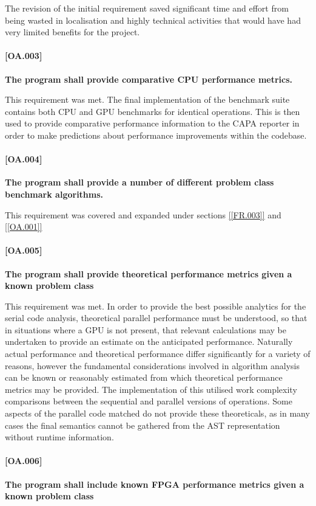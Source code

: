 The revision of the initial requirement saved significant time and effort from being wasted in
localisation and highly technical activities that would have had very limited benefits for the
project.

\paragraph{[OA.003]}
\textbf{The program shall provide comparative CPU performance metrics.}

This requirement was met. The final implementation of the benchmark suite contains both CPU and GPU
benchmarks for identical operations. This is then used to provide comparative performance
information to the CAPA reporter in order to make predictions about performance improvements within
the codebase.

\paragraph{[OA.004]}
\textbf{The program shall provide a number of different problem class benchmark algorithms.}

This requirement was covered and expanded under sections \ref{[FR.003]} and \ref{[OA.001]}

\paragraph{[OA.005]} \label{[OA.005]}
\textbf{The program shall provide theoretical performance metrics given a known problem class}

This requirement was met. In order to provide the best possible analytics for the serial code
analysis, theoretical parallel performance must be understood, so that in situations where a GPU is
not present, that relevant calculations may be undertaken to provide an estimate on the anticipated
performance. Naturally actual performance and theoretical performance differ significantly for a
variety of reasons, however the fundamental considerations involved in algorithm analysis can be
known or reasonably estimated from which theoretical performance metrics may be provided. The
implementation of this utilised work complexity comparisons between the sequential and parallel
versions of operations.  Some aspects of the parallel code matched do not provide these
theoreticals, as in many cases the final semantics cannot be gathered from the AST representation
without runtime information.

\paragraph{[OA.006]}
\textbf{The program shall include known FPGA performance metrics given a known problem class}

